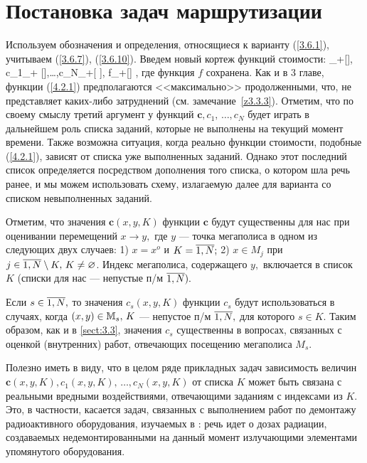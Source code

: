 
\section{
  Постановка задач маршрутизации
}
\label{sect:4.2}
\setcounter{equation}{0}

Используем обозначения и определения,
относящиеся к варианту
(\ref{3.6.1}),
учитываем (\ref{3.6.7}), (\ref{3.6.10}).
Введем новый кортеж функций стоимости:
\bfn
  \label{4.2.1}
  \in \car_+[\bbx\times \bbx\times {}], c_1\in \car_+
  [\bbx\times \bbx\times {}],\ldots,c_N\in \car_+[\bbx\times
  \bbx\times {}], f\in \car_+[\bbx]
  ,
\efn
где функция $f$ сохранена.
Как и в 3 главе,
функции (\ref{4.2.1})
предполагаются <<максимально>> продолженными,
что, не представляет каких-либо затруднений
(см. замечание~\ref{z3.3.3}).
Отметим, что по своему смыслу третий аргумент у функций
$\mathbf{c}, c_1,\,\ldots,c_N$ будет
играть в дальнейшем роль списка заданий,
которые  не выполнены на текущий момент времени.
Также возможна ситуация, когда реально функции стоимости,
подобные (\ref{4.2.1}),
зависят  от списка уже выполненных заданий.
Однако этот последний список определяется посредством дополнения того списка,
о котором шла речь ранее, и мы можем использовать схему,
излагаемую далее для варианта со списком невыполненных заданий.

Отметим,
что значения $\mathbf{c}(x,y,K)$
функции $\mathbf{c}$
будут существенны для нас при оценивании перемещений
$x\rightarrow y,$ где $y$ ---
точка мегаполиса в одном из следующих двух случаев:
1) $x= x^o$ и $K = \ov{1,N};$
2) $x\in M_j$ при $j\in \ov{1,N}\sm K,\, K\neq \emp$.
Индекс мегаполиса,
содержащего $y,$ включается в список $K$
(списки для нас --- непустые п/м $\ov{1,N}).$

Если $s\in \ov{1,N},$
то значения $c_s(x,y,K)$
функции $c_s$ будут
использоваться в случаях, когда $(x,y)\in {\mathbb M}_s,\, K$ ---
непустое п/м
$\ov{1,N},$
для которого $s\in K.$
Таким образом, как и в \ref{sect:3.3},
значения $c_s$ существенны в вопросах,
связанных с оценкой
(внутренних)
работ,
отвечающих посещению мегаполиса $M_s.$

Полезно иметь в виду,
что в целом ряде прикладных задач зависимость величин
$\mathbf{c}(x,y,K), c_1(x,y,K),\,\ldots,c_N(x,y,K)$
от списка $K$
может быть связана с реальными вредными воздействиями,
отвечающими заданиям с индексами из $K.$
Это, в частности, касается задач, связанных с выполнением
работ по демонтажу радиоактивного оборудования,
изучаемых в \cite{Cha2`}:
речь идет о дозах радиации,
создаваемых недемонтированными на данный момент
излучающими элементами упомянутого оборудования.

